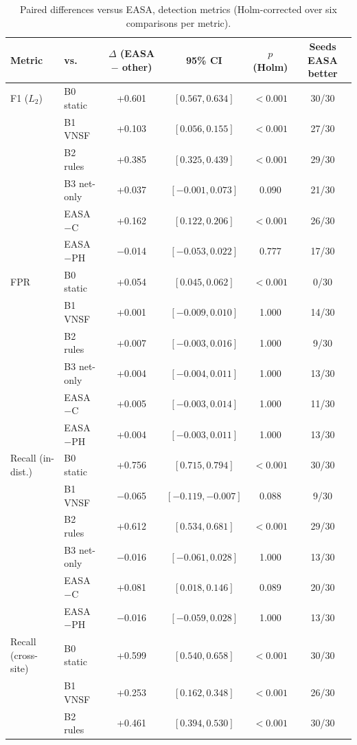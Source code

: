 \begin{table}[!t]
\caption{Paired differences versus EASA, detection metrics (Holm-corrected over six comparisons per metric).}
\label{tab:paired}
\centering\scriptsize
\setlength{\tabcolsep}{4pt}
\begin{tabular}{llcccc}
\toprule
Metric & vs. & $\Delta$ (EASA $-$ other) & 95\% CI & $p$ (Holm) & Seeds EASA better \\
\midrule
F1 ($L_2$) & B0 static & +0.601 & $[0.567, 0.634]$ & $<0.001$ & 30/30 \\
 & B1 VNSF & +0.103 & $[0.056, 0.155]$ & $<0.001$ & 27/30 \\
 & B2 rules & +0.385 & $[0.325, 0.439]$ & $<0.001$ & 29/30 \\
 & B3 net-only & +0.037 & $[-0.001, 0.073]$ & 0.090 & 21/30 \\
 & EASA$-$C & +0.162 & $[0.122, 0.206]$ & $<0.001$ & 26/30 \\
 & EASA$-$PH & $-$0.014 & $[-0.053, 0.022]$ & 0.777 & 17/30 \\
\midrule
FPR & B0 static & +0.054 & $[0.045, 0.062]$ & $<0.001$ & 0/30 \\
 & B1 VNSF & +0.001 & $[-0.009, 0.010]$ & 1.000 & 14/30 \\
 & B2 rules & +0.007 & $[-0.003, 0.016]$ & 1.000 & 9/30 \\
 & B3 net-only & +0.004 & $[-0.004, 0.011]$ & 1.000 & 13/30 \\
 & EASA$-$C & +0.005 & $[-0.003, 0.014]$ & 1.000 & 11/30 \\
 & EASA$-$PH & +0.004 & $[-0.003, 0.011]$ & 1.000 & 13/30 \\
\midrule
Recall (in-dist.) & B0 static & +0.756 & $[0.715, 0.794]$ & $<0.001$ & 30/30 \\
 & B1 VNSF & $-$0.065 & $[-0.119, -0.007]$ & 0.088 & 9/30 \\
 & B2 rules & +0.612 & $[0.534, 0.681]$ & $<0.001$ & 29/30 \\
 & B3 net-only & $-$0.016 & $[-0.061, 0.028]$ & 1.000 & 13/30 \\
 & EASA$-$C & +0.081 & $[0.018, 0.146]$ & 0.089 & 20/30 \\
 & EASA$-$PH & $-$0.016 & $[-0.059, 0.028]$ & 1.000 & 13/30 \\
\midrule
Recall (cross-site) & B0 static & +0.599 & $[0.540, 0.658]$ & $<0.001$ & 30/30 \\
 & B1 VNSF & +0.253 & $[0.162, 0.348]$ & $<0.001$ & 26/30 \\
 & B2 rules & +0.461 & $[0.394, 0.530]$ & $<0.001$ & 30/30 \\

\end{tabular}
\end{table}
